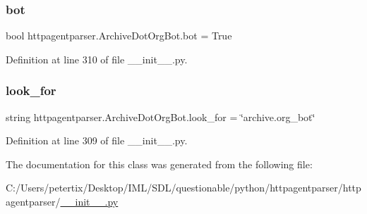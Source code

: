 \subsubsection{\texorpdfstring{bot}{bot}}
{\footnotesize\ttfamily bool httpagentparser.\+Archive\+Dot\+Org\+Bot.\+bot = True\hspace{0.3cm}{\ttfamily [static]}}



Definition at line 310 of file \+\_\+\+\_\+init\+\_\+\+\_\+.\+py.

\hypertarget{classhttpagentparser_1_1_archive_dot_org_bot_a1f2d7847faa0323513c3fe36f5811a59}{}\label{classhttpagentparser_1_1_archive_dot_org_bot_a1f2d7847faa0323513c3fe36f5811a59} 
\subsubsection{\texorpdfstring{look\+\_\+for}{look\_for}}
{\footnotesize\ttfamily string httpagentparser.\+Archive\+Dot\+Org\+Bot.\+look\+\_\+for = \char`\"{}archive.\+org\+\_\+bot\char`\"{}\hspace{0.3cm}{\ttfamily [static]}}



Definition at line 309 of file \+\_\+\+\_\+init\+\_\+\+\_\+.\+py.



The documentation for this class was generated from the following file\+:\begin{DoxyCompactItemize}
\item 
C\+:/\+Users/petertix/\+Desktop/\+I\+M\+L/\+S\+D\+L/questionable/python/httpagentparser/httpagentparser/\hyperlink{____init_____8py}{\+\_\+\+\_\+init\+\_\+\+\_\+.\+py}\end{DoxyCompactItemize}
